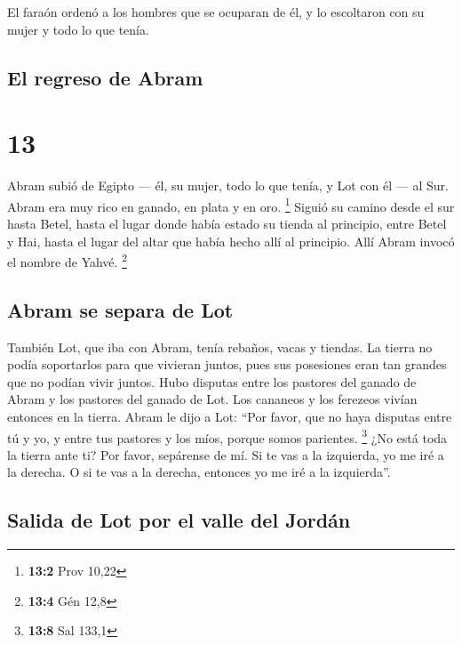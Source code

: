  El faraón ordenó a los hombres que se ocuparan de él, y
lo escoltaron con su mujer y todo lo que tenía.

\hypertarget{el-regreso-de-abram}{%
\subsection{El regreso de Abram}\label{el-regreso-de-abram}}

\hypertarget{section-12}{%
\section{13}\label{section-12}}

 Abram subió de Egipto --- él, su mujer, todo lo que
tenía, y Lot con él --- al Sur.  Abram era muy rico en
ganado, en plata y en oro. \footnote{\textbf{13:2} Prov 10,22}
 Siguió su camino desde el sur hasta Betel, hasta el lugar
donde había estado su tienda al principio, entre Betel y Hai,
 hasta el lugar del altar que había hecho allí al
principio. Allí Abram invocó el nombre de Yahvé. \footnote{\textbf{13:4}
  Gén 12,8}

\hypertarget{abram-se-separa-de-lot}{%
\subsection{Abram se separa de Lot}\label{abram-se-separa-de-lot}}

 También Lot, que iba con Abram, tenía rebaños, vacas y
tiendas.  La tierra no podía soportarlos para que vivieran
juntos, pues sus posesiones eran tan grandes que no podían vivir juntos.
 Hubo disputas entre los pastores del ganado de Abram y
los pastores del ganado de Lot. Los cananeos y los ferezeos vivían
entonces en la tierra.  Abram le dijo a Lot: ``Por favor,
que no haya disputas entre tú y yo, y entre tus pastores y los míos,
porque somos parientes. \footnote{\textbf{13:8} Sal 133,1}
 ¿No está toda la tierra ante ti? Por favor, sepárense de
mí. Si te vas a la izquierda, yo me iré a la derecha. O si te vas a la
derecha, entonces yo me iré a la izquierda''.

\hypertarget{salida-de-lot-por-el-valle-del-jorduxe1n}{%
\subsection{Salida de Lot por el valle del
Jordán}\label{salida-de-lot-por-el-valle-del-jorduxe1n}}

